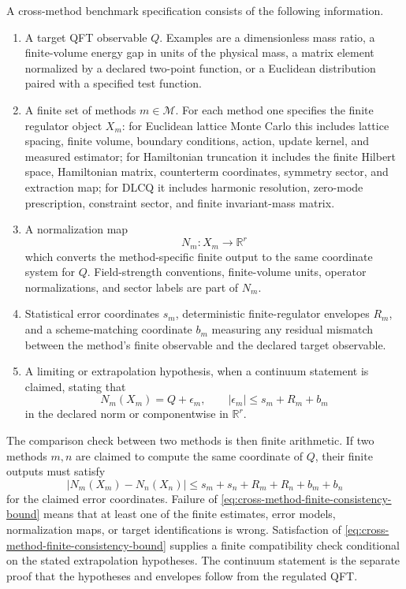 \begin{definition}
\label{def:cross-method-benchmark-datum}
A cross-method benchmark specification consists of the following information.
\begin{enumerate}
  \item A target QFT observable \(Q\).  Examples are a dimensionless mass
  ratio, a finite-volume energy gap in units of the physical mass, a matrix
  element normalized by a declared two-point function, or a Euclidean
  distribution paired with a specified test function.
  \item A finite set of methods \(m\in\mathcal M\).  For each method one
  specifies the finite regulator object \(X_m\): for Euclidean lattice Monte
  Carlo this includes lattice spacing, finite volume, boundary conditions,
  action, update kernel, and measured estimator; for Hamiltonian truncation
  it includes the finite Hilbert space, Hamiltonian matrix, counterterm
  coordinates, symmetry sector, and extraction map; for DLCQ it includes
  harmonic resolution, zero-mode prescription, constraint sector, and finite
  invariant-mass matrix.
  \item A normalization map
  \[
    N_m:X_m\longrightarrow\mathbb R^r
  \]
  which converts the method-specific finite output to the same coordinate
  system for \(Q\).  Field-strength conventions, finite-volume units,
  operator normalizations, and sector labels are part of \(N_m\).
  \item Statistical error coordinates \(s_m\), deterministic finite-regulator
  envelopes \(R_m\), and a scheme-matching coordinate \(b_m\) measuring any
  residual mismatch between the method's finite observable and the declared
  target observable.
  \item A limiting or extrapolation hypothesis, when a continuum statement is
  claimed, stating that
  \[
    N_m(X_m)=Q+\epsilon_m,\qquad
    |\epsilon_m|\leq s_m+R_m+b_m
  \]
  in the declared norm or componentwise in \(\mathbb R^r\).
\end{enumerate}
\end{definition}

The comparison check between two methods is then finite arithmetic.  If
two methods \(m,n\) are claimed to compute the same coordinate of \(Q\), their
finite outputs must satisfy
\begin{equation}
  |N_m(X_m)-N_n(X_n)|
  \leq
  s_m+s_n+R_m+R_n+b_m+b_n
  \label{eq:cross-method-finite-consistency-bound}
\end{equation}
for the claimed error coordinates.  Failure of
\eqref{eq:cross-method-finite-consistency-bound} means that at least one of
the finite estimates, error models, normalization maps, or target
identifications is wrong.  Satisfaction of
\eqref{eq:cross-method-finite-consistency-bound} supplies a finite
compatibility check conditional on the stated extrapolation hypotheses.
The continuum statement is the separate proof that the hypotheses and
envelopes follow from the regulated QFT.


